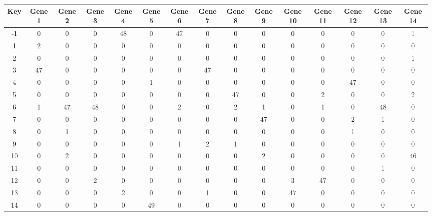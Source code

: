 \begin{tabular}{|c|c|c|c|c|c|c|c|c|c|c|c|c|c|c|}
\hline
Key & Gene 1 & Gene 2 & Gene 3 & Gene 4 & Gene 5 & Gene 6 & Gene 7 & Gene 8 & Gene 9 & Gene 10 & Gene 11 & Gene 12 & Gene 13 & Gene 14 \\
\hline
-1 & 0 & 0 & 0 & 48 & 0 & 47 & 0 & 0 & 0 & 0 & 0 & 0 & 0 & 1 \\
1 & 2 & 0 & 0 & 0 & 0 & 0 & 0 & 0 & 0 & 0 & 0 & 0 & 0 & 0 \\
2 & 0 & 0 & 0 & 0 & 0 & 0 & 0 & 0 & 0 & 0 & 0 & 0 & 0 & 1 \\
3 & 47 & 0 & 0 & 0 & 0 & 0 & 47 & 0 & 0 & 0 & 0 & 0 & 0 & 0 \\
4 & 0 & 0 & 0 & 0 & 1 & 0 & 0 & 0 & 0 & 0 & 0 & 47 & 0 & 0 \\
5 & 0 & 0 & 0 & 0 & 0 & 0 & 0 & 47 & 0 & 0 & 2 & 0 & 0 & 2 \\
6 & 1 & 47 & 48 & 0 & 0 & 2 & 0 & 2 & 1 & 0 & 1 & 0 & 48 & 0 \\
7 & 0 & 0 & 0 & 0 & 0 & 0 & 0 & 0 & 47 & 0 & 0 & 2 & 1 & 0 \\
8 & 0 & 1 & 0 & 0 & 0 & 0 & 0 & 0 & 0 & 0 & 0 & 1 & 0 & 0 \\
9 & 0 & 0 & 0 & 0 & 0 & 1 & 2 & 1 & 0 & 0 & 0 & 0 & 0 & 0 \\
10 & 0 & 2 & 0 & 0 & 0 & 0 & 0 & 0 & 2 & 0 & 0 & 0 & 0 & 46 \\
11 & 0 & 0 & 0 & 0 & 0 & 0 & 0 & 0 & 0 & 0 & 0 & 0 & 1 & 0 \\
12 & 0 & 0 & 2 & 0 & 0 & 0 & 0 & 0 & 0 & 3 & 47 & 0 & 0 & 0 \\
13 & 0 & 0 & 0 & 2 & 0 & 0 & 1 & 0 & 0 & 47 & 0 & 0 & 0 & 0 \\
14 & 0 & 0 & 0 & 0 & 49 & 0 & 0 & 0 & 0 & 0 & 0 & 0 & 0 & 0 \\
\hline
\end{tabular}